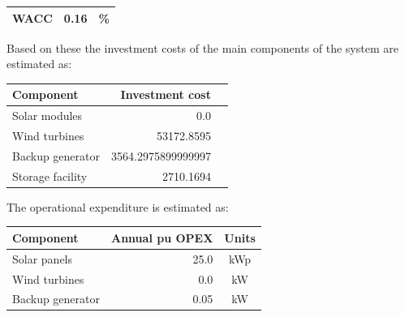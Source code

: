\documentclass{article}
\begin{document}
\begin{multicols*}{2}
\begin{center}
\begin{tabular}{|l|r|c|}
WACC&0.16&\%\\ 

\hline

\end{tabular}

\label{tab:econinputtable}

\end{center}


\vspace{2.5mm}

Based on these the investment costs of the main components of the system are estimated as:

\begin{center}

\begin{tabular}{|l|r|c|}

\hline Component&Investment cost\\ \hline 

Solar modules&0.0\\ 

Wind turbines&53172.8595\\ 

Backup generator&3564.2975899999997\\ 

Storage facility&2710.1694\\ 

\hline

\end{tabular}

\label{tab:investtable}

\end{center}


\vspace{2.5mm}

The operational expenditure is estimated as:

\begin{center}

\begin{tabular}{|l|r|c|}

\hline Component&Annual pu OPEX&Units\\ \hline 

Solar panels&25.0&kWp\\ 

Wind turbines&0.0&kW\\ 

Backup generator&0.05&kW\\ 


\end{tabular}
\end{center}
\end{multicols*}
\end{document}
